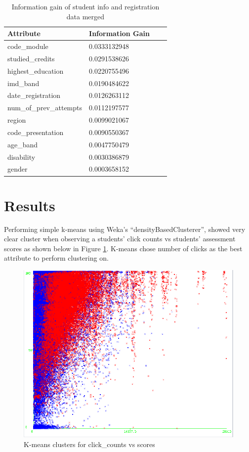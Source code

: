 \documentclass[12pt]{article}
\begin{document}
 
 \begin{table}
\centering
\begin{tabular}{ | l | l | l | p{7.8cm} | }
\hline
\textbf{Attribute} & \textbf{Information Gain} \\
\hline
code\_module & 0.0333132948 \\
\hline
studied\_credits & 0.0291538626 \\
\hline
highest\_education & 0.0220755496 \\
\hline
imd\_band & 0.0190484622 \\
\hline
date\_registration & 0.0126263112 \\
\hline
num\_of\_prev\_attempts & 0.0112197577 \\
\hline
region & 0.0099021067 \\
\hline
code\_presentation & 0.0090550367 \\
\hline
age\_band & 0.0047750479 \\
\hline
disability & 0.0030386879 \\ 
\hline
gender & 0.0003658152 \\
\hline

\end{tabular}
\caption{Information gain of student info and registration data merged}
\label{table:dem_infogain}
\end{table}

\section{Results}

Performing simple k-means using Weka's ``densityBasedClusterer'', showed very clear cluster when observing a students' click counts vs students' assessment scores as shown below in Figure \ref{fig:click_vs_score}.
K-means chose number of clicks as the best attribute to perform clustering on.

\begin{figure}[h]
 \centering
 \includegraphics[scale=0.35]{click_count_vs_score_clusters.png}
 \caption{K-means clusters for click\_counts vs scores}
 \label{fig:click_vs_score}
 \end{figure}
 
\end{document}
